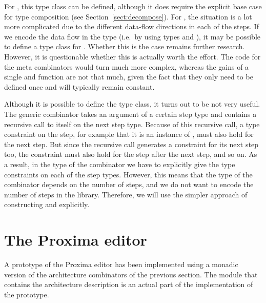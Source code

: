 \documentclass[preprint,natbib]{sigplanconf}
\begin{document}
For , this type class can be defined, although it does require the explicit base case  for type composition (see Section~\ref{sect:decompose}). For , the situation is a lot more complicated due to the different data-flow directions in each of the steps. If we encode the data flow in the  type (i.e.\ by using types  and ), it may be possible to define a type class for . Whether this is the case remains further research.  However, it is questionable whether this is actually worth the effort. The code for the meta combinators would turn much more complex, whereas the gains of a single  and  function are not that much, given the fact that they only need to be defined once and will typically remain constant.


\bc Although it is possible to define the type class, it turns out to be not very useful. The generic combinator takes an argument of a certain step type and contains a recursive call to itself on the next step type. Because of this recursive call, a type constraint on the step, for example that it is an instance of , must also hold for the next step. But since the recursive call generates a constraint for its next step too, the constraint must also hold for the step after the next step, and so on. As a result, in the type of the combinator we have to explicitly give the type constraints on each of the step types. However, this means that the type of the combinator depends on the number of steps, and we do not want to encode the number of steps in the library. Therefore, we will use the simpler approach of constructing  and  explicitly. \ec




\bc

%																
%																
%																
\section{The Proxima editor} \label{sect:proxima}


A prototype of the Proxima editor has been implemented using a monadic version of the architecture combinators of the previous section. The module that contains the architecture description is an actual part of the implementation of the prototype.
\end{document}
